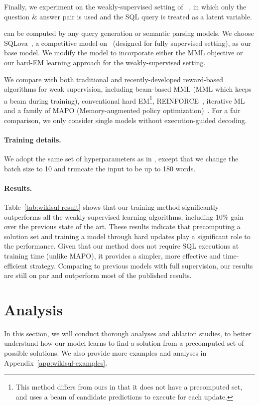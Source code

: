\documentclass[11pt,a4paper]{article}
\begin{document}
Finally, we experiment on the weakly-supervised setting of \wikisql~\citep{wikisql}, in which only the question \& answer pair is used and the SQL query  is treated as a latent variable. 

 can be computed by any query generation or semantic parsing models. We choose SQLova~\citep{hwang2019comprehensive}, a competitive model on \wikisql~(designed for fully supervised setting), as our base model. We modify the model to incorporate either the MML objective or our hard-EM learning approach for the weakly-supervised setting.


We compare with both traditional and recently-developed reward-based algorithms for weak supervision, including beam-based MML (MML which keeps a beam during training), conventional hard EM\footnote{This method differs from ours in that it does not have a precomputed set, and uses a beam of candidate predictions to execute for each update.}, REINFORCE~\citep{reinforce}, iterative ML~\citep{imlfirst,imlsecond} and a family of MAPO (Memory-augmented policy optimization)~\citep{mapo,mapox}. For a fair comparison, we only consider single models without execution-guided decoding.


\paragraph{Training details.}
We adopt the same set of hyperparameters as in \citet{hwang2019comprehensive}, except that we change the batch size to 10 and truncate the input to be up to 180 words. 

\paragraph{Results.}
Table~\ref{tab:wikisql-result} shows that our training method significantly outperforms all the weakly-supervised learning algorithms, including 10\% gain over the previous state of the art.
These results indicate that precomputing a solution set and training a model through hard updates play a significant role to the performance.
Given that our method does not require SQL executions at training time (unlike MAPO), it provides a simpler, more effective and time-efficient strategy. Comparing to previous models with full supervision, our results are still on par and outperform most of the published results. 
 \section{Analysis}\label{sec:analysis}In this section, we will conduct thorough analyses and ablation studies, to better understand how our model learns to find a solution from a precomputed set of possible solutions. We also provide more examples and analyses in Appendix~\ref{app:wikisql-examples}.
\end{document}
